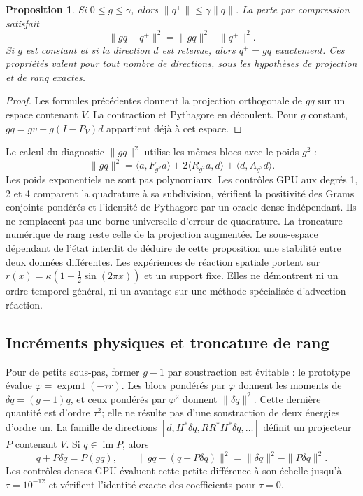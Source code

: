 \documentclass[11pt,a4paper]{article}
\newtheorem{proposition}{Proposition}
\begin{document}
\begin{proposition}
Si $0\leq g\leq\gamma$, alors $\|q^+\|\leq\gamma\|q\|$.
La perte par compression satisfait
\[
 \|gq-q^+\|^2=\|gq\|^2-\|q^+\|^2.
\]
Si $g$ est constant et si la direction $d$ est retenue, alors
$q^+=gq$ exactement. Ces propriétés valent pour tout nombre
de directions, sous les hypothèses de projection et de rang exactes.
\end{proposition}
\begin{proof}
Les formules précédentes donnent la projection orthogonale de $gq$ sur
un espace contenant $V$. La contraction et Pythagore en découlent.
Pour $g$ constant, $gq=gv+g(I-P_V)d$ appartient déjà à cet espace.
\end{proof}

Le calcul du diagnostic $\|gq\|^2$ utilise les mêmes blocs avec le
poids $g^2$ :
\[
 \|gq\|^2=\langle a,F_{g^2}a\rangle
  +2\langle R_{g^2}a,d\rangle+\langle d,A_{g^2}d\rangle.
\]
Les poids exponentiels ne sont pas polynomiaux. Les contrôles GPU
aux degrés 1, 2 et 4 comparent la quadrature à sa subdivision,
vérifient la positivité des Grams conjoints pondérés et l'identité
de Pythagore par un oracle dense indépendant. Ils ne remplacent
pas une borne universelle d'erreur de quadrature. La troncature
numérique de rang reste celle de la projection augmentée.
Le sous-espace dépendant de l'état interdit de déduire de cette
proposition une stabilité entre deux données différentes.
Les expériences de réaction spatiale portent sur
$r(x)=\kappa(1+\tfrac12\sin(2\pi x))$ et un support fixe.
Elles ne démontrent ni un ordre temporel général, ni un avantage
sur une méthode spécialisée d'advection--réaction.

\subsection{Incréments physiques et troncature de rang}
Pour de petits sous-pas, former $g-1$ par soustraction est évitable :
le prototype évalue $\varphi=\operatorname{expm1}(-\tau r)$.
Les blocs pondérés par $\varphi$ donnent les moments de
$\delta q=(g-1)q$, et ceux pondérés par $\varphi^2$ donnent
$\|\delta q\|^2$. Cette dernière quantité est d'ordre $\tau^2$;
elle ne résulte pas d'une soustraction de deux énergies d'ordre un.
La famille de directions $[d,H^*\delta q,RR^*H^*\delta q,\ldots]$
définit un projecteur $P$ contenant $V$. Si $q\in\operatorname{im}P$,
alors
\[
 q+P\delta q=P(gq),\qquad
 \|gq-(q+P\delta q)\|^2=\|\delta q\|^2-\|P\delta q\|^2.
\]
Les contrôles denses GPU évaluent cette petite différence à son échelle
jusqu'à $\tau=10^{-12}$ et vérifient l'identité exacte des coefficients
pour $\tau=0$.
\end{document}
